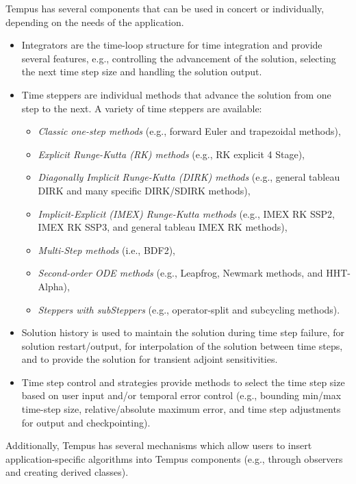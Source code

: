 Tempus has several components that can be used in concert or
individually, depending on the needs of the application.
\begin{itemize}
  \item Integrators are the time-loop structure for time integration
  and provide several features, e.g., controlling the advancement of
  the solution, selecting the next time step size and handling the
  solution output.

  \item Time steppers are individual methods that advance the
  solution from one step to the next.  A variety of time steppers
  are available:
  \begin{itemize}
    \item \emph{Classic one-step methods} (e.g., forward Euler and trapezoidal methods),
    \item \emph{Explicit Runge-Kutta (RK) methods} (e.g., RK explicit 4 Stage),
    \item \emph{Diagonally Implicit Runge-Kutta (DIRK) methods} (e.g.,
    general tableau DIRK and many specific DIRK/SDIRK methods),
    \item \emph{Implicit-Explicit (IMEX) Runge-Kutta methods} (e.g., IMEX
    RK SSP2, IMEX RK SSP3, and general tableau IMEX RK methods),
    \item \emph{Multi-Step methods} (i.e., BDF2),
    \item \emph{Second-order ODE methods} (e.g., Leapfrog, Newmark methods,
    and HHT-Alpha),
    \item \emph{Steppers with subSteppers} (e.g., operator-split and
    subcycling methods).
  \end{itemize}

  \item Solution history is used to maintain the solution during
  time step failure, for solution restart/output, for interpolation of
  the solution between time steps, and to provide the solution for
  transient adjoint sensitivities.

  \item Time step control and strategies provide methods to select
  the time step size based on user input and/or temporal error
  control (e.g., bounding min/max time-step size, relative/absolute
  maximum error, and time step adjustments for output and checkpointing).
\end{itemize}

Additionally, Tempus has several mechanisms which allow users to
insert application-specific algorithms into Tempus components (e.g.,
through observers and creating derived classes).

